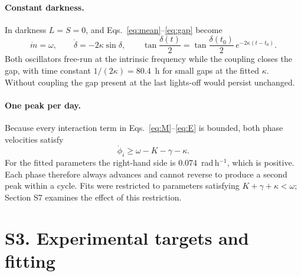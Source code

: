 \documentclass[10pt,a4paper]{article}
\begin{document}
\paragraph{Constant darkness.}
In darkness $L=S=0$, and Eqs.~\eqref{eq:mean}--\eqref{eq:gap} become
\begin{equation}
 \dot m=\omega,\qquad
 \dot\delta=-2\kappa\sin\delta,\qquad
 \tan\frac{\delta(t)}{2}
 =\tan\frac{\delta(t_0)}{2}\,e^{-2\kappa(t-t_0)}.
\end{equation}
Both oscillators free-run at the intrinsic frequency while the coupling
closes the gap, with time constant $1/(2\kappa)=80.4$~h for small gaps at
the fitted $\kappa$. Without coupling the gap present at the last
lights-off would persist unchanged.

\paragraph{One peak per day.}
Because every interaction term in Eqs.~\eqref{eq:M}--\eqref{eq:E} is
bounded, both phase velocities satisfy
\begin{equation}
 \dot\phi_i\geq\omega-K-\gamma-\kappa.\label{eq:bound}
\end{equation}
For the fitted parameters the right-hand side is 0.074~rad\,h$^{-1}$,
which is positive. Each phase therefore always advances and cannot
reverse to produce a second peak within a cycle. Fits were restricted to
parameters satisfying $K+\gamma+\kappa<\omega$; Section S7 examines the
effect of this restriction.

\section*{S3. Experimental targets and fitting}
\end{document}
